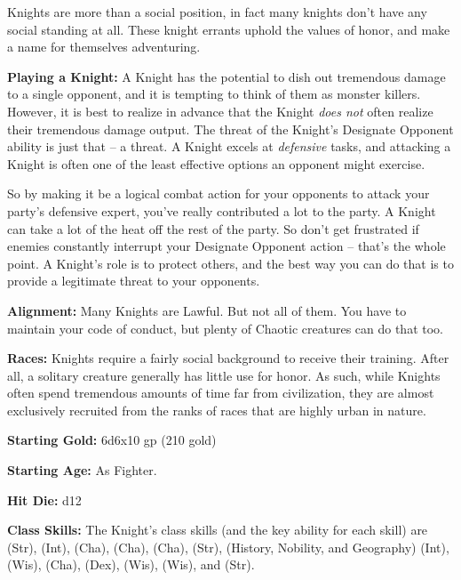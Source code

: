 
Knights are more than a social position, in fact many knights don't have any social standing at all. These knight errants uphold the values of honor, and make a name for themselves adventuring.

\textbf{Playing a Knight:} A Knight has the potential to dish out tremendous damage to a single opponent, and it is tempting to think of them as monster killers. However, it is best to realize in advance that the Knight \textit{does not} often realize their tremendous damage output. The threat of the Knight's Designate Opponent ability is just that -- a threat. A Knight excels at \textit{defensive} tasks, and attacking a Knight is often one of the least effective options an opponent might exercise.

So by making it be a logical combat action for your opponents to attack your party's defensive expert, you've really contributed a lot to the party. A Knight can take a lot of the heat off the rest of the party. So don't get frustrated if enemies constantly interrupt your Designate Opponent action -- that's the whole point. A Knight's role is to protect others, and the best way you can do that is to provide a legitimate threat to your opponents.

\textbf{Alignment:} Many Knights are Lawful. But not all of them. You have to maintain your code of conduct, but plenty of Chaotic creatures can do that too.

\textbf{Races:} Knights require a fairly social background to receive their training. After all, a solitary creature generally has little use for honor. As such, while Knights often spend tremendous amounts of time far from civilization, they are almost exclusively recruited from the ranks of races that are highly urban in nature.

\textbf{Starting Gold:} 6d6x10 gp (210 gold)

\textbf{Starting Age:} As Fighter.

\textbf{Hit Die:} d12

\textbf{Class Skills:} The Knight's class skills (and the key ability for each skill) are  (Str),  (Int),  (Cha),  (Cha),  (Cha),  (Str),  (History, Nobility, and Geography) (Int),  (Wis),  (Cha),  (Dex),  (Wis),  (Wis), and  (Str).

